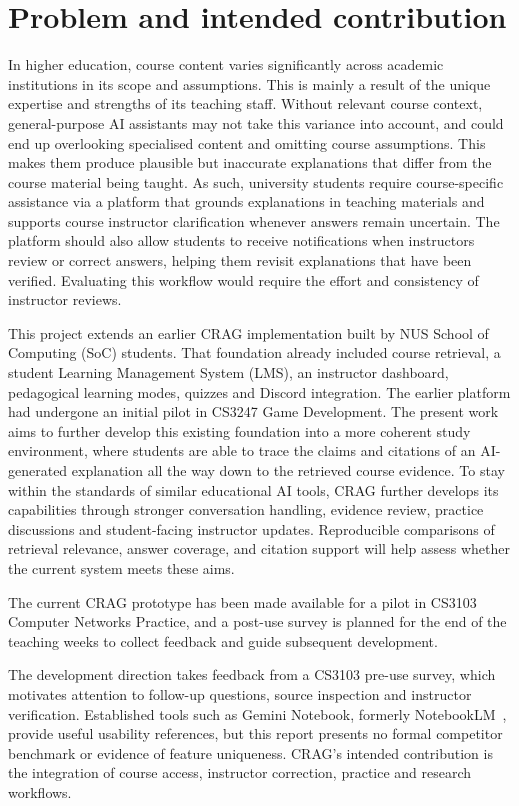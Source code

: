 \section{Problem and intended contribution}
In higher education, course content varies significantly across academic institutions in its scope and assumptions. This is mainly a result of the unique expertise and strengths of its teaching staff. Without relevant course context, general-purpose AI assistants may not take this variance into account, and could end up overlooking specialised content and omitting course assumptions. This makes them produce plausible but inaccurate explanations that differ from the course material being taught.
As such, university students require course-specific assistance via a platform that grounds explanations in teaching materials and supports course instructor clarification whenever answers remain uncertain. The platform should also allow students to receive notifications when instructors review or correct answers, helping them revisit explanations that have been verified. Evaluating this workflow would require the effort and consistency of instructor reviews.

This project extends an earlier CRAG implementation built by NUS School of Computing (SoC) students. That foundation already included course retrieval, a student Learning Management System (LMS), an instructor dashboard, pedagogical learning modes, quizzes and Discord integration. The earlier platform had undergone an initial pilot in CS3247 Game Development. The present work aims to further develop this existing foundation into a more coherent study environment, where students are able to trace the claims and citations of an AI-generated explanation all the way down to the retrieved course evidence. To stay within the standards of similar educational AI tools, CRAG further develops its capabilities through stronger conversation handling, evidence review, practice discussions and student-facing instructor updates. Reproducible comparisons of retrieval relevance, answer coverage, and citation support will help assess whether the current system meets these aims.

The current CRAG prototype has been made available for a pilot in CS3103 Computer Networks Practice, and a post-use survey is planned for the end of the teaching weeks to collect feedback and guide subsequent development.

The development direction takes feedback from a CS3103 pre-use survey, which motivates attention to follow-up questions, source inspection and instructor verification. Established tools such as Gemini Notebook, formerly NotebookLM~\parencite{googlenotebook}, provide useful usability references, but this report presents no formal competitor benchmark or evidence of feature uniqueness. CRAG's intended contribution is the integration of course access, instructor correction, practice and research workflows.

